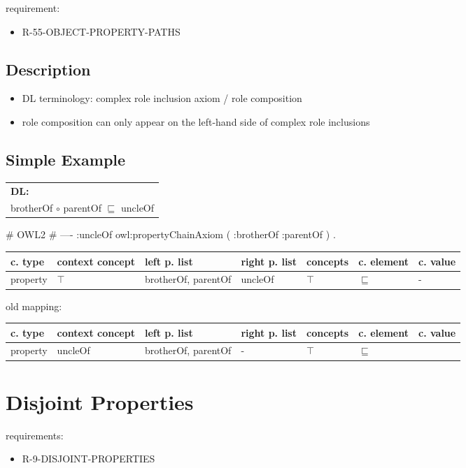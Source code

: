 \documentclass{llncs}
\newenvironment{gcotable}{
  \scriptsize
  \sffamily
  \vspace{0.3cm}
  \begin{tabular}{l|l|l|l|l|l|l}
  \hline
  \textbf{c. type} & \textbf{context concept} & \textbf{left p. list} & \textbf{right p. list} & \textbf{concepts} & \textbf{c. element} & \textbf{c. value} \\
  \hline

}{
  \hline
  \end{tabular}
  \linebreak
}
\newenvironment{DL}{
  \scriptsize
  \sffamily
  \vspace{0.3cm}
  \begin{tabular}{l}
	\textbf{DL:} \\

}{
  \end{tabular}
  \linebreak
}
\begin{document}
requirement:

\begin{itemize}
	\item R-55-OBJECT-PROPERTY-PATHS
\end{itemize}

\subsection{Description}

\begin{itemize}
  \item DL terminology: complex role inclusion axiom / role composition
	\item role composition can only appear on the left-hand side of complex role inclusions \cite{Kroetzsch2012}
\end{itemize}

\subsection{Simple Example}

\begin{DL}
brotherOf $\circ$ parentOf $\sqsubseteq$ uncleOf 
\end{DL}

\begin{ex}
# OWL2
# ----
:uncleOf owl:propertyChainAxiom ( :brotherOf :parentOf ) . 
\end{ex}

\begin{gcotable}
property & $\top$ & brotherOf, parentOf & uncleOf & $\top$ & $\sqsubseteq$ & -  \\
\end{gcotable}

old mapping: 

\begin{gcotable}
property & uncleOf & brotherOf, parentOf & - & $\top$ & $\sqsubseteq$ \\
\end{gcotable}

\section{Disjoint Properties}

requirements:

\begin{itemize}
	\item R-9-DISJOINT-PROPERTIES
\end{itemize}
\end{document}
